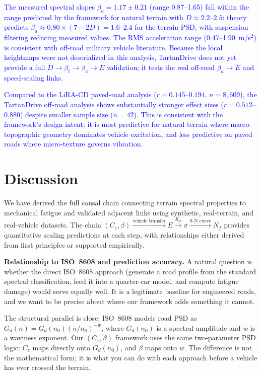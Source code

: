 \documentclass[11pt]{article}
\begin{document}
\textcolor{blue}{The measured spectral slopes $\beta_a = 1.17 \pm 0.21$ (range 0.87--1.65) fall within the range predicted by the framework for natural terrain with $D \approx 2.2$--$2.5$: theory predicts $\beta_a \approx 0.80 \times (7-2D) = 1.6$--$2.4$ for the terrain PSD, with suspension filtering reducing measured values. The RMS acceleration range (0.47--1.90~m/s$^2$) is consistent with off-road military vehicle literature\cite{Wong2022}. Because the local heightmaps were not deserialized in this analysis, TartanDrive does not yet provide a full $D \rightarrow \beta_t \rightarrow \beta_a \rightarrow E$ validation; it tests the real off-road $\beta_a \rightarrow E$ and speed-scaling links.}

\textcolor{blue}{Compared to the LiRA-CD paved-road analysis ($r = 0.145$--$0.194$, $n = 8{,}609$), the TartanDrive off-road analysis shows substantially stronger effect sizes ($r = 0.512$--$0.880$) despite smaller sample size ($n = 42$). This is consistent with the framework's design intent: it is most predictive for natural terrain where macro-topographic geometry dominates vehicle excitation, and less predictive on paved roads where micro-texture governs vibration.}

\section*{Discussion}

We have derived the full causal chain connecting terrain spectral properties to mechanical fatigue and validated adjacent links using synthetic, real-terrain, and real-vehicle datasets. The chain $(C_z, \beta) \xrightarrow{\text{vehicle transfer}} E \xrightarrow{K_\sigma} \sigma \xrightarrow{\text{S-N curve}} N_f$ provides quantitative scaling predictions at each step, with relationships either derived from first principles or supported empirically.

\textbf{Relationship to ISO~8608 and prediction accuracy.} A natural question is whether the direct ISO~8608 approach (generate a road profile from the standard spectral classification, feed it into a quarter-car model, and compute fatigue damage) would serve equally well. It is a legitimate baseline for engineered roads, and we want to be precise about where our framework adds something it cannot.

The structural parallel is close: ISO~8608\cite{ISO8608} models road PSD as $G_d(n) = G_d(n_0)(n/n_0)^{-w}$, where $G_d(n_0)$ is a spectral amplitude and $w$ is a waviness exponent. Our $(C_z, \beta)$ framework uses the same two-parameter PSD logic: $C_z$ maps directly onto $G_d(n_0)$, and $\beta$ maps onto $w$. The difference is not the mathematical form; it is what you can do with each approach before a vehicle has ever crossed the terrain.
\end{document}
